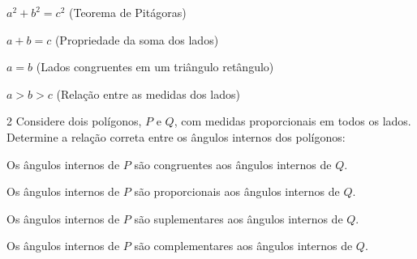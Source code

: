 \begin{escolha}[itemsep=0pt]
\item $a^2 + b^2 = c^2$ (Teorema de Pitágoras)
\item $a + b = c$ (Propriedade da soma dos lados)
\item $a = b$ (Lados congruentes em um triângulo retângulo)
\item $a > b > c$ (Relação entre as medidas dos lados)
\end{escolha}



\num{2} Considere dois polígonos, $P$ e $Q$, com medidas proporcionais em todos
os lados. Determine a relação correta entre os ângulos internos dos
polígonos:

\begin{escolha}[itemsep=0pt]
  \item Os ângulos internos de $P$ são congruentes aos ângulos internos de $Q$.
  \item Os ângulos internos de $P$ são proporcionais aos ângulos internos de $Q$.
  \item Os ângulos internos de $P$ são suplementares aos ângulos internos de $Q$.
  \item Os ângulos internos de $P$ são complementares aos ângulos internos de $Q$.
\end{escolha}

